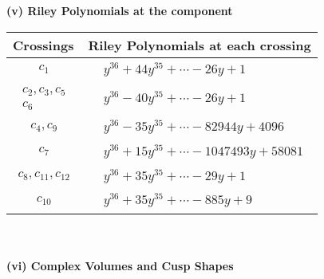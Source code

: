 \documentclass[1p]{elsarticle_modified}
\theoremstyle{definition}
\begin{document}
\newpage\renewcommand{\arraystretch}{1}
\flushleft \textbf{(v) Riley Polynomials at the component}\newline \\
\begin{tabular}{m{50pt}|m{274pt}}
Crossings & \hspace{64pt}Riley Polynomials at each crossing \\
\hline $$\begin{aligned}c_{1}\end{aligned}$$&$\begin{aligned}
&y^{36}+44 y^{35}+\cdots-26 y+1
\end{aligned}$\\
\hline $$\begin{aligned}c_{2},c_{3},c_{5}\\c_{6}\end{aligned}$$&$\begin{aligned}
&y^{36}-40 y^{35}+\cdots-26 y+1
\end{aligned}$\\
\hline $$\begin{aligned}c_{4},c_{9}\end{aligned}$$&$\begin{aligned}
&y^{36}-35 y^{35}+\cdots-82944 y+4096
\end{aligned}$\\
\hline $$\begin{aligned}c_{7}\end{aligned}$$&$\begin{aligned}
&y^{36}+15 y^{35}+\cdots-1047493 y+58081
\end{aligned}$\\
\hline $$\begin{aligned}c_{8},c_{11},c_{12}\end{aligned}$$&$\begin{aligned}
&y^{36}+35 y^{35}+\cdots-29 y+1
\end{aligned}$\\
\hline $$\begin{aligned}c_{10}\end{aligned}$$&$\begin{aligned}
&y^{36}+35 y^{35}+\cdots-885 y+9
\end{aligned}$\\
\hline
\end{tabular}\\~\\
\newpage\flushleft \textbf{(vi) Complex Volumes and Cusp Shapes}
\end{document}
